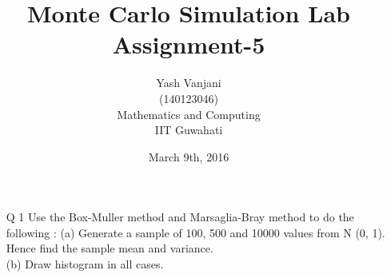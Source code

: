 \documentclass[12pt]{book}
\begin{document}
\title{\textbf{Monte Carlo Simulation Lab\\Assignment-5}}	
\author{Yash Vanjani\\(140123046)\\Mathematics and Computing\\IIT Guwahati}
\date{March 9th, 2016}

\maketitle

\newpage
\begin{enumerate}
\item[Q 1] Use the Box-Muller method and Marsaglia-Bray method to do the following :
(a) Generate a sample of 100, 500 and 10000 values from N (0, 1). Hence find the
sample mean and variance.\\
(b) Draw histogram in all cases.
\end{enumerate}
\end{document}
